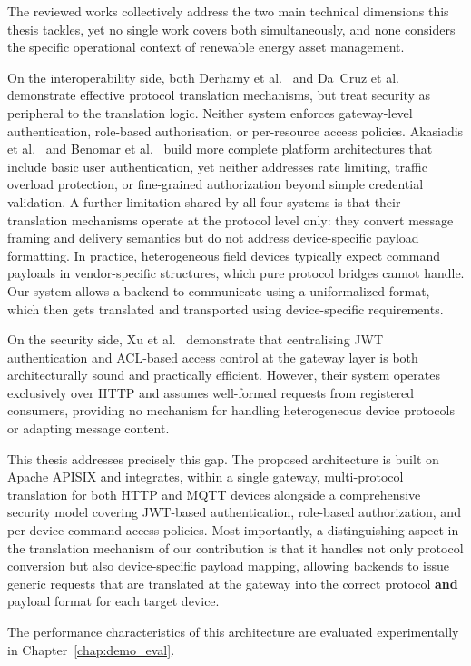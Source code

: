 The reviewed works collectively address the two main technical dimensions this thesis tackles, yet no single work covers both simultaneously, and none considers the specific operational context of renewable energy asset management.

On the interoperability side, both Derhamy et al.~\cite{derhamy2017} and Da~Cruz et al.~\cite{dacruz2019} demonstrate effective protocol translation mechanisms, but treat security as peripheral to the translation logic. Neither system enforces gateway-level authentication, role-based authorisation, or per-resource access policies. Akasiadis et al.~\cite{akasiadis2019}  and Benomar et al.~\cite{benomar2024} build more complete platform architectures that include basic user authentication, yet neither addresses rate limiting, traffic overload protection, or fine-grained authorization beyond simple credential validation. A further limitation shared by all four systems is that their translation mechanisms operate at the protocol level only: they convert message framing and delivery semantics but do not address device-specific payload formatting. In practice, heterogeneous field devices typically expect command payloads in vendor-specific structures, which pure protocol bridges cannot handle. Our system allows a backend to communicate using a uniformalized format, which then gets translated and transported using device-specific requirements. 

On the security side, Xu et al.~\cite{xu2019}  demonstrate that centralising JWT authentication and ACL-based access control at the gateway layer is both architecturally sound and practically efficient. However, their system operates exclusively over HTTP and assumes well-formed requests from registered consumers, providing no mechanism for handling heterogeneous device protocols or adapting message content.

This thesis addresses precisely this gap. The proposed architecture is built on Apache APISIX and integrates, within a single gateway, multi-protocol translation for both HTTP and MQTT devices alongside a comprehensive security model covering JWT-based authentication, role-based authorization, and per-device command access policies. Most importantly, a distinguishing aspect in the translation mechanism of our contribution is that it handles not only protocol conversion but also device-specific payload mapping, allowing backends to issue generic requests that are translated at the gateway into the correct protocol \textbf{and} payload format for each target device. 

The performance characteristics of this architecture are evaluated experimentally in Chapter~\ref{chap:demo_eval}.